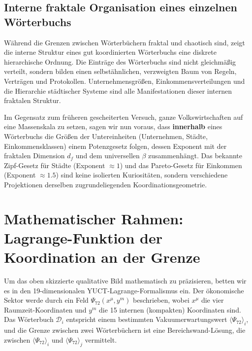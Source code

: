 \documentclass[12pt,a4paper]{article}
\theoremstyle{remark}
\begin{document}
	\subsection{Interne fraktale Organisation eines einzelnen Wörterbuchs}
	
	Während die Grenzen zwischen Wörterbüchern fraktal und chaotisch sind, zeigt die interne Struktur eines gut koordinierten Wörterbuchs eine diskrete hierarchische Ordnung. Die Einträge des Wörterbuchs sind nicht gleichmäßig verteilt, sondern bilden einen selbstähnlichen, verzweigten Baum von Regeln, Verträgen und Protokollen. Unternehmensgrößen, Einkommensverteilungen und die Hierarchie städtischer Systeme sind alle Manifestationen dieser internen fraktalen Struktur.
	
	Im Gegensatz zum früheren gescheiterten Versuch, ganze Volkswirtschaften auf eine Massenskala zu setzen, sagen wir nun voraus, dass \textbf{innerhalb} eines Wörterbuchs die Größen der Untereinheiten (Unternehmen, Städte, Einkommensklassen) einem Potenzgesetz folgen, dessen Exponent mit der fraktalen Dimension \(d_f\) und dem universellen \(\beta\) zusammenhängt. Das bekannte Zipf-Gesetz für Städte (Exponent \(\approx 1\)) und das Pareto-Gesetz für Einkommen (Exponent \(\approx 1.5\)) sind keine isolierten Kuriositäten, sondern verschiedene Projektionen derselben zugrundeliegenden Koordinationsgeometrie.
	
	\section{Mathematischer Rahmen: Lagrange-Funktion der Koordination an der Grenze}
	
	Um das oben skizzierte qualitative Bild mathematisch zu präzisieren, betten wir es in den 19-dimensionalen YUCT-Lagrange-Formalismus ein. Der ökonomische Sektor werde durch ein Feld \(\Psi_{72}(x^\mu, y^m)\) beschrieben, wobei \(x^\mu\) die vier Raumzeit-Koordinaten und \(y^m\) die 15 internen (kompakten) Koordinaten sind. Das Wörterbuch \(\mathcal{D}_i\) entspricht einem bestimmten Vakuumerwartungswert \(\langle \Psi_{72} \rangle_i\), und die Grenze zwischen zwei Wörterbüchern ist eine Bereichswand-Lösung, die zwischen \(\langle \Psi_{72} \rangle_i\) und \(\langle \Psi_{72} \rangle_j\) vermittelt.
	
\end{document}

